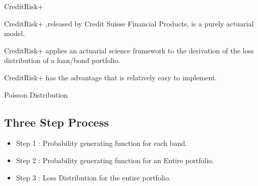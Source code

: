 CreditRisk+

CreditRisk+ ,released by Credit Suisse Financial Products, is a purely actuarial model.

 

CreditRisk+ applies an actuarial science framework to the derivation of the loss distribution of a loan/bond portfolio.

 

CreditRisk+ has the advantage that is relatively easy to implement.

 

Poisson Distribution

 
\subsection{Three Step Process}

\begin{itemize}
\item Step 1 : Probability generating function for each band.
\item Step 2 : Probability generating function for an Entire portfolio.
\item Step 3 : Loss Distribution for the entire portfolio.
\end{itemize}
 

